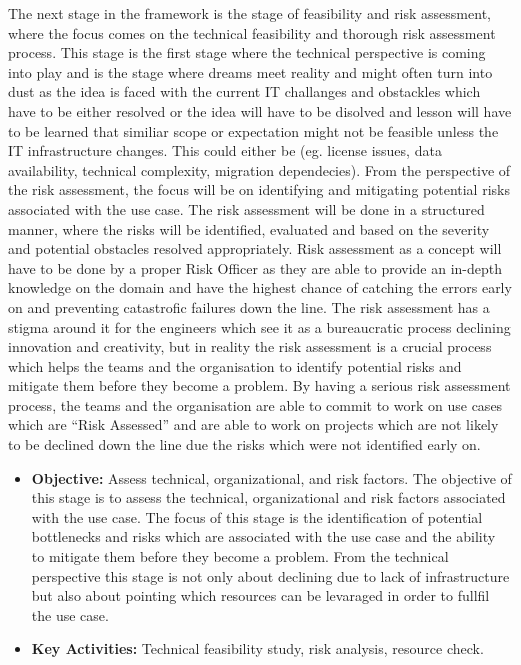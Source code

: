 \documentclass[]{imc-inf}
\begin{document}
The next stage in the framework is the stage of feasibility and risk
assessment, where the focus comes on the technical feasibility and
thorough risk assessment process. This stage is the first stage where
the technical perspective is coming into play and is the stage where
dreams meet reality and might often turn into dust as the idea is faced
with the current IT challanges and obstackles which have to be either
resolved or the idea will have to be disolved and lesson will have to be
learned that similiar scope or expectation might not be feasible unless
the IT infrastructure changes. This could either be (eg. license issues,
data availability, technical complexity, migration dependecies). From
the perspective of the risk assessment, the focus will be on identifying
and mitigating potential risks associated with the use case. The risk
assessment will be done in a structured manner, where the risks will be
identified, evaluated and based on the severity and potential obstacles
resolved appropriately. Risk assessment as a concept will have to be
done by a proper Risk Officer as they are able to provide an in-depth
knowledge on the domain and have the highest chance of catching the
errors early on and preventing catastrofic failures down the line. The
risk assessment has a stigma around it for the engineers which see it as
a bureaucratic process declining innovation and creativity, but in
reality the risk assessment is a crucial process which helps the teams
and the organisation to identify potential risks and mitigate them
before they become a problem. By having a serious risk assessment
process, the teams and the organisation are able to commit to work on
use cases which are ``Risk Assessed'' and are able to work on projects
which are not likely to be declined down the line due the risks which
were not identified early on.

\begin{itemize}
	\item
	\textbf{Objective:} Assess technical, organizational, and risk
	factors. The objective of this stage is to assess the technical,
	organizational and risk factors associated with the use case. The
	focus of this stage is the identification of potential bottlenecks and
	risks which are associated with the use case and the ability to
	mitigate them before they become a problem. From the technical
	perspective this stage is not only about declining due to lack of
	infrastructure but also about pointing which resources can be
	levaraged in order to fullfil the use case.
	\item
	\textbf{Key Activities:} Technical feasibility study, risk analysis,
	resource check.
\end{itemize}
\end{document}
